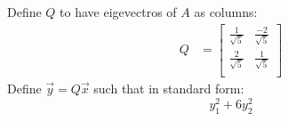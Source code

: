 \documentclass[11pt]{homework}
\begin{document}
Define $Q$ to have eigevectros of $A$ as columns:
\begin{align*}
Q &= 
  \begin{bmatrix}
    \frac{1}{\sqrt{5}} & \frac{-2}{\sqrt{5}} \\
    \frac{2}{\sqrt{5}} & \frac{1}{\sqrt{5}} \\
  \end{bmatrix}
\end{align*}
Define $ \vec y = Q \vec x$ such that
in standard form:
\begin{equation*}
 y_1^2 + 6 y_2^2
\end{equation*}
\end{document}
